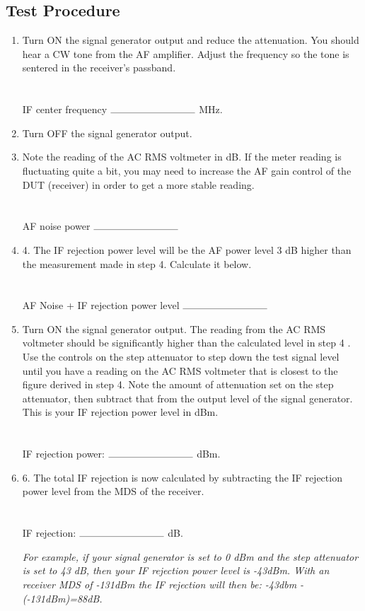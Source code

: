 \documentclass[10pt,letterpaper]{book}
\begin{document}
\subsection*{Test Procedure}
\begin{enumerate}
	\item Turn ON the signal generator output and reduce the attenuation. You should hear a CW tone from the AF amplifier. Adjust the frequency so the tone is sentered in the receiver's passband. \\ \\ \\
	IF center frequency $\rule{3cm}{0.1mm}$ MHz.

	\item Turn OFF the signal generator output.

	\item Note the reading of the AC RMS voltmeter in dB. If the meter reading is fluctuating quite a bit, you may need to increase the AF gain control of the DUT (receiver) in order to get a more stable reading. \\ \\ \\
	AF noise power $\rule{3cm}{0.1mm}$ 

	\item 4. The IF rejection power level will be the AF power level 3 dB higher than the measurement made in step 4. Calculate it below.\\ \\ \\

AF Noise + IF rejection power level $\rule{3cm}{0.1mm}$ 

	\item Turn ON the signal generator output. The reading from the AC RMS voltmeter should be significantly higher than the calculated level in step 4 . Use the controls on the step attenuator to step down the test signal level until you have a reading on the AC RMS voltmeter that is closest to the figure derived in step 4. Note the amount of attenuation set on the step attenuator, then subtract that from the output level of the signal generator. This is your IF rejection power level in dBm.\\ \\ \\
	 IF rejection power: $\rule{3cm}{0.1mm}$ dBm.
	 
	\item 6. The total IF rejection is now calculated by subtracting the IF rejection power level from the MDS of the receiver. \\ \\ \\
	 IF rejection: $\rule{3cm}{0.1mm}$ dB.


	\emph{For example, if your signal generator is set to 0 dBm and the step attenuator is set to 43 dB, then your IF rejection power level is -43dBm. With an receiver MDS of -131dBm the IF rejection will then be: -43dbm -(-131dBm)=88dB.}
\end{enumerate}
\end{document}
